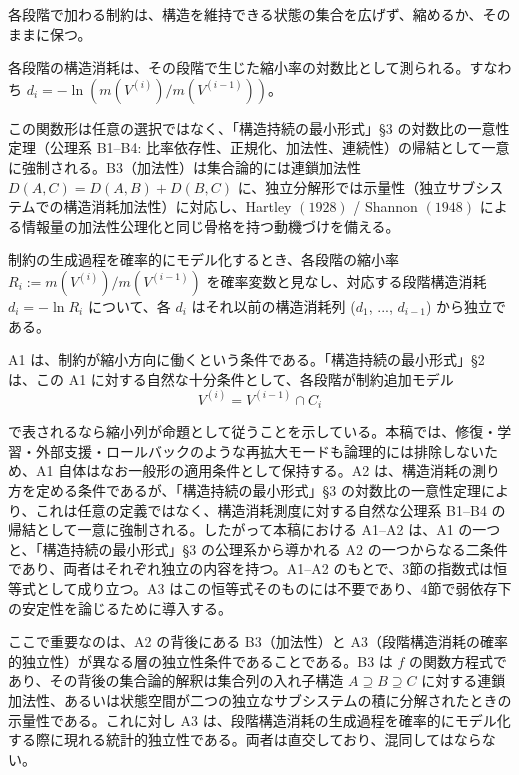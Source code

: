\documentclass[12pt,a4paper]{article}
\begin{document}
\begin{assumption}[A1]
各段階で加わる制約は、構造を維持できる状態の集合を広げず、縮めるか、そのままに保つ。
\end{assumption}

\begin{assumption}[A2]
各段階の構造消耗は、その段階で生じた縮小率の対数比として測られる。すなわち
$d_i = -\ln(m(V^{(i)})/m(V^{(i-1)}))$。

この関数形は任意の選択ではなく、「構造持続の最小形式」§3 の対数比の一意性定理（公理系 B1–B4: 比率依存性、正規化、加法性、連続性）の帰結として一意に強制される。B3（加法性）は集合論的には連鎖加法性
$D(A,C) = D(A,B) + D(B,C)$
に、独立分解形では示量性（独立サブシステムでの構造消耗加法性）に対応し、Hartley $(1928)$ / Shannon $(1948)$ による情報量の加法性公理化と同じ骨格を持つ動機づけを備える。
\end{assumption}

\begin{assumption}[A3]
制約の生成過程を確率的にモデル化するとき、各段階の縮小率 $R_i := m(V^{(i)})/m(V^{(i-1)})$ を確率変数と見なし、対応する段階構造消耗 $d_i = -\ln R_i$ について、各 $d_i$ はそれ以前の構造消耗列 ($d_1$, ..., $d_{i-1}$) から独立である。
\end{assumption}

A1 は、制約が縮小方向に働くという条件である。「構造持続の最小形式」§2 は、この A1 に対する自然な十分条件として、各段階が制約追加モデル \[
V^{(i)} = V^{(i-1)} ∩ C_{i}
\]

で表されるなら縮小列が命題として従うことを示している。本稿では、修復・学習・外部支援・ロールバックのような再拡大モードも論理的には排除しないため、A1 自体はなお一般形の適用条件として保持する。A2 は、構造消耗の測り方を定める条件であるが、「構造持続の最小形式」§3 の対数比の一意性定理により、これは任意の定義ではなく、構造消耗測度に対する自然な公理系 B1--B4 の帰結として一意に強制される。したがって本稿における A1--A2 は、A1 の一つと、「構造持続の最小形式」§3 の公理系から導かれる A2 の一つからなる二条件であり、両者はそれぞれ独立の内容を持つ。A1--A2 のもとで、3節の指数式は恒等式として成り立つ。A3 はこの恒等式そのものには不要であり、4節で弱依存下の安定性を論じるために導入する。

ここで重要なのは、A2 の背後にある B3（加法性）と A3（段階構造消耗の確率的独立性）が異なる層の独立性条件であることである。B3 は \(f\) の関数方程式であり、その背後の集合論的解釈は集合列の入れ子構造 \(A \supseteq B \supseteq C\) に対する連鎖加法性、あるいは状態空間が二つの独立なサブシステムの積に分解されたときの示量性である。これに対し A3 は、段階構造消耗の生成過程を確率的にモデル化する際に現れる統計的独立性である。両者は直交しており、混同してはならない。
\end{document}
